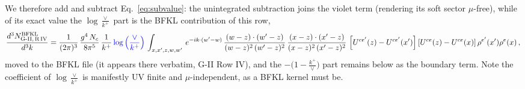 \documentclass[9pt]{article}
\numberwithin{equation}{section}
\begin{document}
We therefore add and subtract Eq.~\eqref{eq:subvalue}: the unintegrated subtraction joins the
violet term (rendering its soft sector $\mu$-free), while of its exact value the
$\log\frac{\vee}{k^{+}}$ part is the BFKL contribution of this row,
\begin{align}
    \frac{d^{3}N^{\rm BFKL}_{\rm G\text{-}II,\,R\,IV}}{d^{3}k} =      \frac{1}{(2\pi)^{3}}\,\frac{g^{4}\,N_{c}}{8\pi^{5}}\,\frac{1}{k^{+}}\,{\color{blue}\log{\left(\frac{\vee}{k^{+}}\right)}}\,\int_{x,x',z,w,w'}\,e^{-ik\cdot (w'-w)}\,\frac{(w-z)\cdot(w'-z)}{(w-z)^{2}\,(w'-z)^{2}}\,\frac{(x-z)\cdot(x'-z)}{(x-z)^{2}\,(x'-z)^{2}}\,
    \left[U^{ce'}(z) - U^{ce'}(x')\right]\left[U^{ce}(z) - U^{ce}(x)\right]\rho^{e'}(x')\rho^{e}(x)\,,
\end{align}
moved to the BFKL file (it appears there verbatim, G-II Row IV), and the
$-\big(1-\frac{k^{+}}{\vee}\big)$ part remains below as the boundary term. Note the coefficient of
$\log\frac{\vee}{k^{+}}$ is manifestly UV finite and $\mu$-independent, as a BFKL kernel must be.
\end{document}
